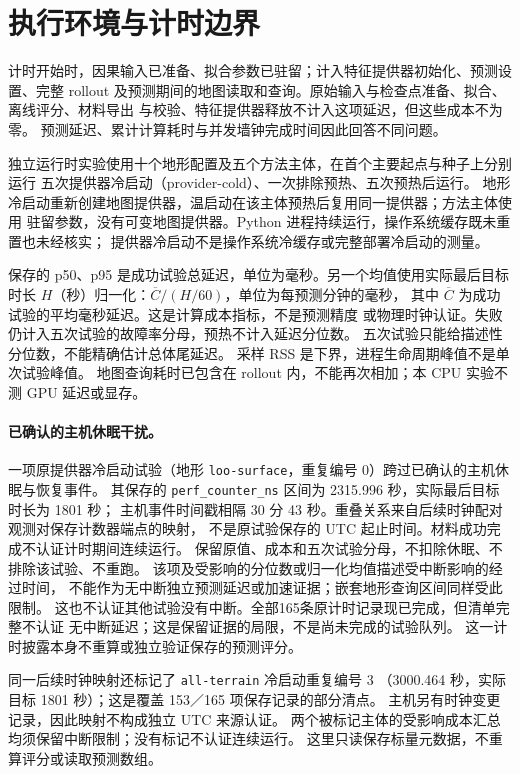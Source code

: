 \section{执行环境与计时边界}
\label{sec:runtime-environment}\hypertarget{sec:runtime-environment}{}
计时开始时，因果输入已准备、拟合参数已驻留；计入特征提供器初始化、预测设置、完整
rollout 及预测期间的地图读取和查询。原始输入与检查点准备、拟合、离线评分、材料导出
与校验、特征提供器释放不计入这项延迟，但这些成本不为零。
预测延迟、累计计算耗时与并发墙钟完成时间因此回答不同问题。

独立运行时实验使用十个地形配置及五个方法主体，在首个主要起点与种子上分别运行
五次提供器冷启动（provider-cold）、一次排除预热、五次预热后运行。
地形冷启动重新创建地图提供器，温启动在该主体预热后复用同一提供器；方法主体使用
驻留参数，没有可变地图提供器。Python 进程持续运行，操作系统缓存既未重置也未经核实；
提供器冷启动不是操作系统冷缓存或完整部署冷启动的测量。

保存的 p50、p95 是成功试验总延迟，单位为毫秒。另一个均值使用实际最后目标时长
\(H\)（秒）归一化：\(\overline C/(H/60)\)，单位为每预测分钟的毫秒，
其中 \(\overline C\) 为成功试验的平均毫秒延迟。这是计算成本指标，不是预测精度
或物理时钟认证。失败仍计入五次试验的故障率分母，预热不计入延迟分位数。
五次试验只能给描述性分位数，不能精确估计总体尾延迟。
采样 RSS 是下界，进程生命周期峰值不是单次试验峰值。
地图查询耗时已包含在 rollout 内，不能再次相加；本 CPU 实验不测 GPU 延迟或显存。

\paragraph{已确认的主机休眠干扰。}
一项原提供器冷启动试验（地形 \texttt{loo-surface}，重复编号 0）跨过已确认的主机休眠与恢复事件。
其保存的 \texttt{perf\_counter\_ns} 区间为 2315.996 秒，实际最后目标时长为 1801 秒；
主机事件时间戳相隔 30 分 43 秒。重叠关系来自后续时钟配对观测对保存计数器端点的映射，
不是原试验保存的 UTC 起止时间。材料成功完成不认证计时期间连续运行。
保留原值、成本和五次试验分母，不扣除休眠、不排除该试验、不重跑。
该项及受影响的分位数或归一化均值描述受中断影响的经过时间，
不能作为无中断独立预测延迟或加速证据；嵌套地形查询区间同样受此限制。
这也不认证其他试验没有中断。全部165条原计时记录现已完成，但清单完整不认证
无中断延迟；这是保留证据的局限，不是尚未完成的试验队列。
这一计时披露本身不重算或独立验证保存的预测评分。

同一后续时钟映射还标记了 \texttt{all-terrain} 冷启动重复编号 3
（3000.464 秒，实际目标 1801 秒）；这是覆盖 153／165 项保存记录的部分清点。
主机另有时钟变更记录，因此映射不构成独立 UTC 来源认证。
两个被标记主体的受影响成本汇总均须保留中断限制；没有标记不认证连续运行。
这里只读保存标量元数据，不重算评分或读取预测数组。



